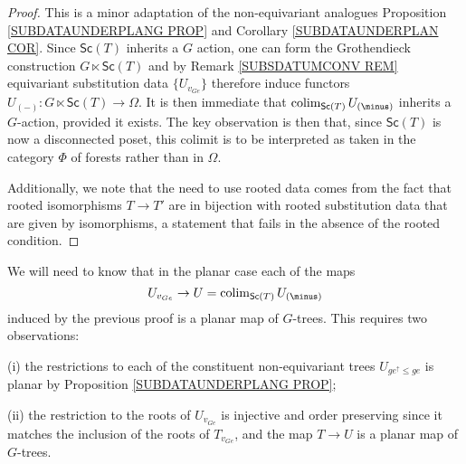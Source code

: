 \documentclass[a4paper,10pt]{article}%
\begin{document}
\begin{proof}
  This is a minor adaptation of the non-equivariant analogues Proposition \ref{SUBDATAUNDERPLANG PROP} and Corollary \ref{SUBDATAUNDERPLAN COR}.
  Since $\mathsf{Sc}(T)$ inherits a $G$ action, one can form the Grothendieck construction $G \ltimes \mathsf{Sc}(T)$ and by Remark \ref{SUBSDATUMCONV REM} equivariant substitution data $\{U_{v_{Ge}}\}$ therefore induce functors 
  $U_{(\minus)} \colon G \ltimes \mathsf{Sc}(T) \to \Omega$.
  It is then immediate that $\colim_{\mathsf{Sc}(T)} U_{(\minus)}$ inherits a $G$-action, provided it exists. 
  The key observation is then that, since $\mathsf{Sc}(T)$ is now a disconnected poset, this colimit is to be interpreted as taken in the category $\Phi$ of forests rather than in $\Omega$.
  
  Additionally, we note that the need to use rooted data comes from the fact that rooted isomorphisms $T \to T'$ are in bijection with rooted substitution data that are given by isomorphisms, a statement that fails in the absence of the rooted condition.
\end{proof}

\begin{remark} We will need to know that in the planar case each of the maps 
  \[U_{v_{Ge}} \to U = \colim_{\mathsf{Sc}(T)}U_{(\minus)}\]
  induced by the previous proof is a planar map of $G$-trees.
  This requires two observations:
  \begin{inparaenum}
  \item[(i)] the restrictions to each of the constituent non-equivariant trees $U_{ge^{\uparrow}\leq ge}$ is planar by Proposition \ref{SUBDATAUNDERPLANG PROP};
  \item[(ii)] the restriction to the roots of $U_{v_{Ge}}$ is injective and order preserving since it matches the inclusion of the roots of $T_{v_{Ge}}$, and the map $T \to U$ is a planar map of $G$-trees.
  \end{inparaenum}
\end{remark}
\end{document}
